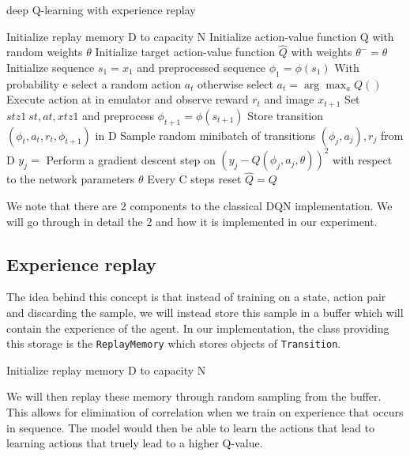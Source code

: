 \documentclass{article}
\newcommand{\code}[1]{\lstinline|#1|}
\begin{document}
\begin{algorithm}
    \caption{deep Q-learning with experience replay}\label{alg:cap}
    \begin{algorithmic}
    \State Initialize replay memory D to capacity N
    \State Initialize action-value function Q with random weights $\theta$
    \State Initialize target action-value function $\hat Q$ with weights $\theta^- = \theta$
        \State Initialize sequence $s_1 = {x_1}$ and preprocessed sequence $\phi_1 = \phi(s_1)$
        \State With probability e select a random action $a_t$
        \State otherwise select $a_t = \arg \max_a Q()$
        \State Execute action at in emulator and observe reward $r_t$ and image $x_{t+1}$
        \State Set $s tz1~s t ,at ,xtz1$ and preprocess $\phi_{t+1} = \phi(s_{t+1})$
        \State Store transition $(\phi_t,a_t,r_t,\phi_{t+1})$ in D
        \State Sample random minibatch of transitions $(\phi_j,a_j),r_j$ from D
        \State $y_j = $
        \State Perform a gradient descent step on $(y_j - Q(\phi_j,a_j,\theta))^2$ with respect to the
        \State network parameters $\theta$
        \State Every C steps reset $\hat Q = Q$
        \EndFor
    \EndFor
    \end{algorithmic}
\end{algorithm}

We note that there are 2 components to the classical DQN implementation. We will
go through in detail the 2 and how it is implemented in our experiment.

\subsection*{Experience replay}
The idea behind this concept is that instead of training on a state, action pair
and discarding the sample, we will instead store this sample in a buffer which
will contain the experience of the agent. In our implementation, the class providing
this storage is the \code{ReplayMemory} which stores objects of \code{Transition}.

\begin{displayquote}
    Initialize replay memory D to capacity N
\end{displayquote}

We will then replay these memory through random sampling from the buffer. This
allows for elimination of correlation when we train on experience that occurs in
sequence. The model would then be able to learn the actions that lead to learning
actions that truely lead to a higher Q-value.
\end{document}

